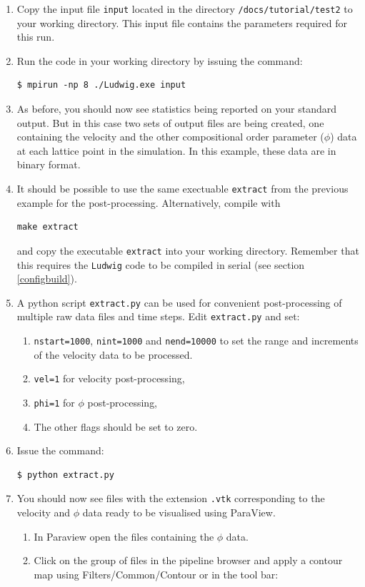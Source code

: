 \documentclass[11pt,twoside,a4paper]{article}
\begin{document}
\begin{enumerate}
\item Copy the input file \texttt{input} located in the directory 
\texttt{/docs/tutorial/test2} 
to your working directory. This input file contains the parameters required for this run. 
\item Run the code in your working directory by issuing the command:
\begin{lstlisting}
$ mpirun -np 8 ./Ludwig.exe input
\end{lstlisting}
\item As before, you should now see statistics being reported on your standard output. But 
in this case two sets of output files are being created, one containing the velocity and 
the other compositional order parameter ($\phi$) data at each lattice point in the simulation. 
In this example, these data are in binary format.
\item It should be possible to use the same exectuable \texttt{extract} from the previous 
example for the  post-processing. Alternatively, compile with 
\begin{lstlisting}
make extract
\end{lstlisting} 
and copy the executable \texttt{extract} into your working directory.
Remember that this requires the \texttt{Ludwig} code to be compiled in serial 
(see section \ref{configbuild}).
\item A python script \texttt{extract.py}
can be used for convenient post-processing of multiple raw data files and time steps.
 Edit \texttt{extract.py} and set:
\begin{enumerate}
\item \texttt{nstart=1000}, \texttt{nint=1000} and \texttt{nend=10000} to set the range and 
increments of the velocity data
to be processed.
\item \texttt{vel=1} for velocity post-processing, 
\item \texttt{phi=1} for $\phi$ post-processing,
\item The other flags should be set to zero. 
\end{enumerate}
\item Issue the command:
\begin{lstlisting}
$ python extract.py
\end{lstlisting}
\item You should now see files with the extension \texttt{.vtk} corresponding to the velocity 
and $\phi$ data ready to be visualised using ParaView.
\begin{enumerate}
\item In Paraview open the files containing the $\phi$ data.
\item Click on the group of files in the pipeline browser and apply a contour map using 
Filters/Common/Contour or in the tool bar: 


\end{enumerate}
\end{enumerate}
\end{document}
